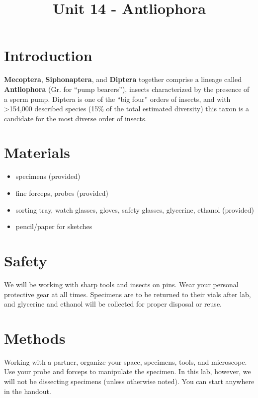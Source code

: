 \documentclass[letterpaper, 11pt]{article}
\title{Unit 14 - Antliophora}%
\author{}
\begin{document}
\cleanlookdateon %
\maketitle
\thispagestyle{fancy}
\section*{Introduction}
\textbf{Mecoptera}, \textbf{Siphonaptera}, and \textbf{Diptera} together comprise a lineage called \textbf{Antliophora} (Gr. for ``pump bearers''), insects characterized by the presence of a sperm pump. Diptera is one of the ``big four'' orders of insects, and with \textgreater154,000 described species (15\% of the total estimated diversity) this taxon is a candidate for the most diverse order of insects. 

\section*{Materials}
\begin{itemize}
\item specimens (provided)
\item fine forceps, probes (provided)
\item sorting tray, watch glasses, gloves, safety glasses, glycerine, ethanol (provided)
\item pencil/paper for sketches
\end{itemize}

\section*{Safety}
We will be working with sharp tools and insects on pins. Wear your personal protective gear at all times. Specimens are to be returned to their vials after lab, and glycerine and ethanol will be collected for proper disposal or reuse.

\section*{Methods}
Working with a partner, organize your space, specimens, tools, and microscope. Use your probe and forceps to manipulate the specimen. In this lab, however, we will not be dissecting specimens (unless otherwise noted). You can start anywhere in the handout.
\end{document}
